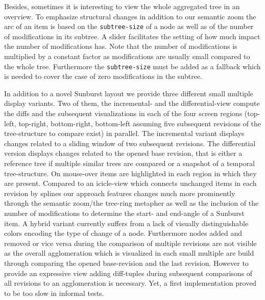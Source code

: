 Besides, sometimes it is interesting to view the whole aggregated tree in an overview. To emphasize structural changes in addition to our semantic zoom the arc of an item is based on the \texttt{subtree-size} of a node as well as of the number of modifications in its subtree. A slider facilitates the setting of how much impact the number of modifications has. Note that the number of modifications is multiplied by a constant factor as modifications are usually small compared to the whole tree. Furthermore the \texttt{subtree-size} must be added as a fallback which is needed to cover the case of zero modifications in the subtree.

In addition to a novel Sunburst layout we provide three different small multiple display variants. Two of them, the incremental- and the differential-view compute the diffs and the subsequent visualizations in each of the four screen regions (top-left, top-right, bottom-right, bottom-left assuming five subsequent revisions of the tree-structure to compare exist) in parallel. The incremental variant displays changes related to a sliding window of two subsequent revisions. The differential version displays changes related to the opened base revision, that is either a reference tree if multiple similar trees are compared or a snapshot of a temporal tree-structure. On mouse-over items are highlighted in each region in which they are present. Compared to an icicle-view which connects unchanged items in each revision by splines our approach features changes much more prominently through the semantic zoom/the tree-ring metapher as well as the inclusion of the number of modifications to determine the start- and end-angle of a Sunburst item. A hybrid variant currently suffers from a lack of visually distinguishable colors encoding the type of change of a node. Furthermore nodes added and removed or vice versa during the comparison of multiple revisions are not visible as the overall agglomeration which is visualized in each small multiple are build through comparing the opened base-revision and the last revision. However to provide an expressive view adding diff-tuples during subsequent comparisons of all revisions to an agglomeration is necessary. Yet, a first implementation proved to be too slow in informal tests.

